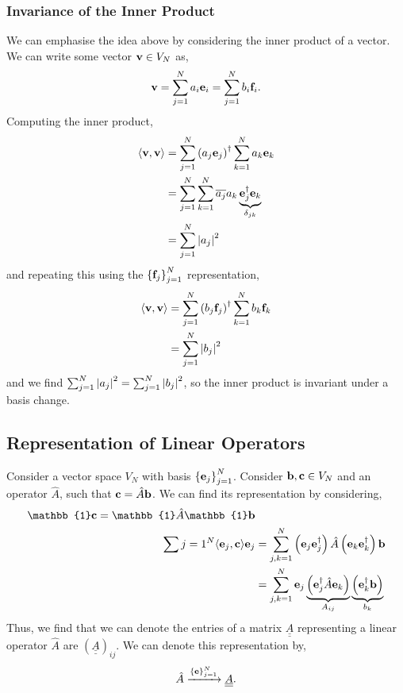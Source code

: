 \documentclass{book}
\def\innerproduct#1#2{{\langle #1},{#2 \rangle}}
\def\doubleunderline#1{\underline{\underline{#1}}}
\begin{document}
\subsubsection{Invariance of the Inner Product}
We can emphasise the idea above by considering the inner product of a vector. We can write some vector $\vb{v}\in V_N$ as,
\begin{equation}
	\vb{v} = \sum_{j=1}^Na_i\vb{e}_i = \sum_{j=1}^N b_i\vb{f}_i.
\end{equation}
Computing the inner product,
\begin{equation}
	\begin{split}
	\innerproduct{\vb{v}}{\vb{v}} & = \sum_{j=1}^N\left(a_j\vb{e}_j\right)^{\dag}\sum_{k=1}^Na_k\vb{e}_k \\
	& = \sum_{j=1}^N\sum_{k=1}^N\overline{a_j}a_k\underbrace{\vb{e}_j^{\dag}\vb{e}_k}_{\delta_{jk}} \\
	& = \sum_{j=1}^N\abs{a_j}^2
	\end{split}
\end{equation}
and repeating this using the $\left\{\vb{f}_j\right\}_{j=1}^N$ representation,
\begin{equation}
	\begin{split}
		\innerproduct{\vb{v}}{\vb{v}} & = \sum_{j=1}^N\left(b_j\vb{f}_j\right)^{\dag}\sum_{k=1}^Nb_k\vb{f}_k \\
		& = \sum_{j=1}^N\abs{b_j}^2
	\end{split}
\end{equation}
and we find $\sum_{j=1}^N\abs{a_j}^2 = \sum_{j=1}^N\abs{b_j}^2$, so the inner product is invariant under a basis change.
\subsection{Representation of Linear Operators}
Consider a vector space $V_N$ with basis $\left\{\vb{e}_j\right\}_{j=1}^N$. Consider $\vb{b},\vb{c} \in V_N$ and an operator $\hat{A}$, such that $\vb{c} = \hat{A}\vb{b}$. We can find its representation by considering,
\begin{equation}
	\begin{split}
		\mathbb{1} \vb{c} = \mathbb{1} \hat{A}\mathbb{1}\vb{b} & \\
		\sum{j=1}^N \innerproduct{\vb{e}_j}{\vb{c}} \vb{e}_j & = \sum_{j,k=1}^N\left(\vb{e}_j\vb{e}_j^{\dag}\right)\hat{A}\left(\vb{e}_k\vb{e}_k^{\dag}\right)\vb{b} \\
		& = \sum_{j,k=1}^N \vb{e}_j\underbrace{\left(\vb{e}_j^{\dag}\hat{A}\vb{e}_k\right)}_{A_{ij}}\underbrace{\left(\vb{e}_k^{\dag}\vb{b}\right)}_{b_k}
	\end{split}
\end{equation}
Thus, we find that we can denote the entries of a matrix $\doubleunderline{A}$ representing a linear operator $\hat{A}$ are $\left(\doubleunderline{A}\right)_{ij}$. We can denote this representation by,
\begin{align}
	\hat{A} \xrightarrow{\left\{\vb{e}\right\}_{j=1}^N} \doubleunderline{A}.
\end{align}
\end{document}
